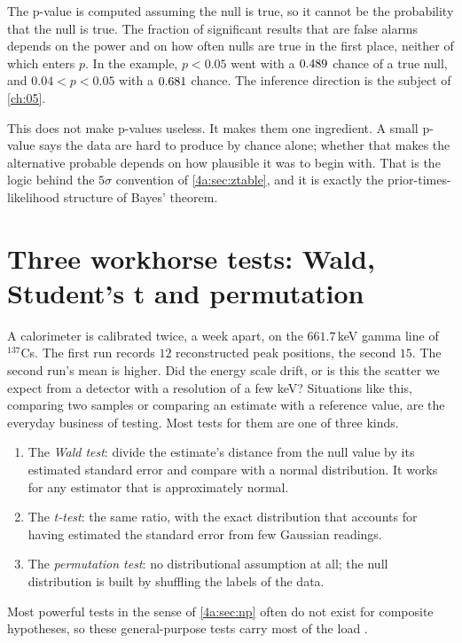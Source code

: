 \begin{pitfall}
The p-value is computed assuming the null is true, so it cannot be the
probability that the null is true. The fraction of significant results that
are false alarms depends on the power and on how often nulls are true in the
first place, neither of which enters $p$. In the example, $p<0.05$ went with a
$0.489$ chance of a true null, and $0.04<p<0.05$ with a
$0.681$ chance. The inference direction is the subject of
\cref{ch:05}.
\end{pitfall}

This does not make p-values useless. It makes them one ingredient. A small
p-value says the data are hard to produce by chance alone; whether that makes
the alternative probable depends on how plausible it was to begin with. That
is the logic behind the $5\sigma$ convention of \cref{4a:sec:ztable}, and it
is exactly the prior-times-likelihood structure of Bayes' theorem.
\section{Three workhorse tests: Wald, Student's t and permutation}
\label{4a:sec:wald}

A calorimeter is calibrated twice, a week apart, on the $661.7\,$keV gamma
line of $^{137}$Cs. The first run records $12$ reconstructed peak positions,
the second $15$. The second run's mean is higher. Did the energy
scale drift, or is this the scatter we expect from a detector with a
resolution of a few keV? Situations like this, comparing two samples or
comparing an estimate with a reference value, are the everyday business of
testing. Most tests for them are one of three kinds.
\begin{enumerate}[label=\arabic*.]
  \item The \emph{Wald test}: divide the estimate's distance from the null
        value by its estimated standard error and compare with a normal
        distribution. It works for any estimator that is approximately normal.
  \item The \emph{t-test}: the same ratio, with the exact distribution that
        accounts for having estimated the standard error from few Gaussian
        readings.
  \item The \emph{permutation test}: no distributional assumption at all; the
        null distribution is built by shuffling the labels of the data.
\end{enumerate}
Most powerful tests in the sense of \cref{4a:sec:np} often do not exist for
composite hypotheses, so these general-purpose tests carry most of the load
.

